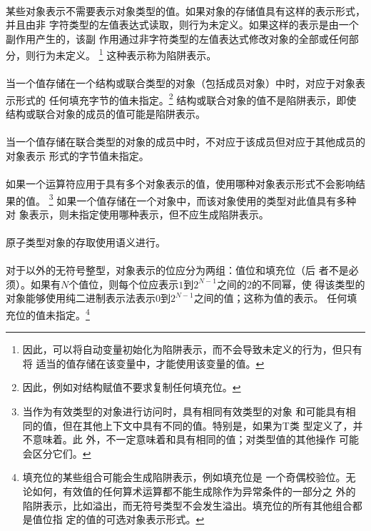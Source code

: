 {\paragraph{}
某些对象表示不需要表示对象类型的值。如果对象的存储值具有这样的表示形式，并且由非
字符类型的左值表达式读取，则行为未定义。如果这样的表示是由一个副作用产生的，该副
作用通过非字符类型的左值表达式修改对象的全部或任何部分，则行为未定义。
\footnote{因此，可以将自动变量初始化为陷阱表示，而不会导致未定义的行为，但只有将
适当的值存储在该变量中，才能使用该变量的值。} 这种表示称为陷阱表示。

\paragraph{}
当一个值存储在一个结构或联合类型的对象（包括成员对象）中时，对应于对象表示形式的
任何填充字节的值未指定。\footnote{因此，例如对结构赋值不要求复制任何填充位。}
结构或联合对象的值不是陷阱表示，即使结构或联合对象的成员的值可能是陷阱表示。

\paragraph{}
当一个值存储在联合类型的对象的成员中时，不对应于该成员但对应于其他成员的对象表示
形式的字节值未指定。

\paragraph{}
如果一个运算符应用于具有多个对象表示的值，使用哪种对象表示形式不会影响结果的值。
\footnote{当作为有效类型的对象进行访问时，具有相同有效类型的对象
和可能具有相同的值，但在其他上下文中具有不同的值。特别是，如果为T类
型定义了\tm{==}，并不意味着。此
外，不一定意味着和具有相同的值；对类型值的其他操作
可能会区分它们。} 如果一个值存储在一个对象中，而该对象使用的类型对此值具有多种对
象表示，则未指定使用哪种表示，但不应生成陷阱表示。

\paragraph{}
原子类型对象的存取使用语义进行。


\paragraph{}
对于以外的无符号整型，对象表示的位应分为两组：值位和填充位（后
者不是必须）。如果有$N$个值位，则每个位应表示$1$到$2^{N-1}$之间的$2$的不同幂，使
得该类型的对象能够使用纯二进制表示法表示$0$到$2^{N-1}$之间的值；这称为值的表示。
任何填充位的值未指定。\footnote{填充位的某些组合可能会生成陷阱表示，例如填充位是
一个奇偶校验位。无论如何，有效值的任何算术运算都不能生成除作为异常条件的一部分之
外的陷阱表示，比如溢出，而无符号类型不会发生溢出。填充位的所有其他组合都是值位指
定的值的可选对象表示形式。}

}
